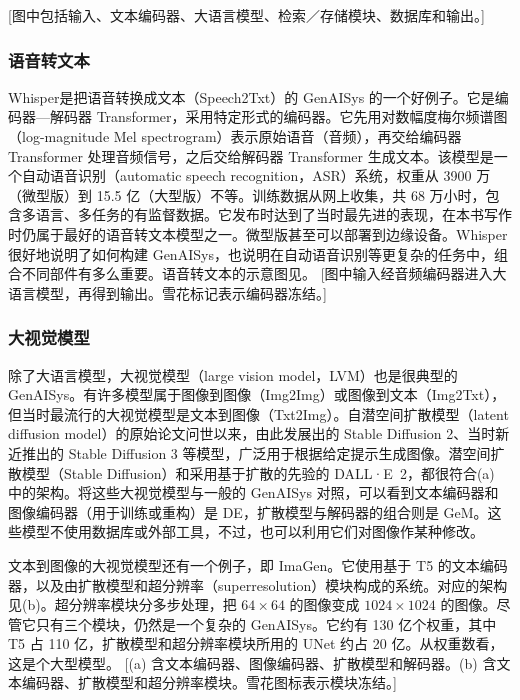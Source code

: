 [图中包括输入、文本编码器、大语言模型、检索／存储模块、数据库和输出。]

\subsubsection{语音转文本}
Whisper是把语音转换成文本（Speech2Txt）的 GenAISys 的一个好例子。它是编码器—解码器 Transformer，采用特定形式的编码器。它先用对数幅度梅尔频谱图（log-magnitude Mel spectrogram）表示原始语音（音频），再交给编码器 Transformer 处理音频信号，之后交给解码器 Transformer 生成文本。该模型是一个自动语音识别（automatic speech recognition，ASR）系统，权重从 3900 万（微型版）到 15.5 亿（大型版）不等。训练数据从网上收集，共 68 万小时，包含多语言、多任务的有监督数据。它发布时达到了当时最先进的表现，在本书写作时仍属于最好的语音转文本模型之一。微型版甚至可以部署到边缘设备。Whisper 很好地说明了如何构建 GenAISys，也说明在自动语音识别等更复杂的任务中，组合不同部件有多么重要。语音转文本的示意图见。
[图中输入经音频编码器进入大语言模型，再得到输出。雪花标记表示编码器冻结。]

\subsubsection{大视觉模型}
除了大语言模型，大视觉模型（large vision model，LVM）也是很典型的 GenAISys。有许多模型属于图像到图像（Img2Img）或图像到文本（Img2Txt），但当时最流行的大视觉模型是文本到图像（Txt2Img）。自潜空间扩散模型（latent diffusion model）的原始论文问世以来，由此发展出的 Stable Diffusion 2、当时新近推出的 Stable Diffusion 3 等模型，广泛用于根据给定提示生成图像。潜空间扩散模型（Stable Diffusion）和采用基于扩散的先验的 DALL·E~2，都很符合(a) 中的架构。将这些大视觉模型与一般的 GenAISys 对照，可以看到文本编码器和图像编码器（用于训练或重构）是 DE，扩散模型与解码器的组合则是 GeM。这些模型不使用数据库或外部工具，不过，也可以利用它们对图像作某种修改。

文本到图像的大视觉模型还有一个例子，即 ImaGen。它使用基于 T5 的文本编码器，以及由扩散模型和超分辨率（superresolution）模块构成的系统。对应的架构见(b)。超分辨率模块分多步处理，把 $64\times64$ 的图像变成 $1024\times1024$ 的图像。尽管它只有三个模块，仍然是一个复杂的 GenAISys。它约有 130 亿个权重，其中 T5 占 110 亿，扩散模型和超分辨率模块所用的 UNet 约占 20 亿。从权重数看，这是个大型模型。
[(a) 含文本编码器、图像编码器、扩散模型和解码器。(b) 含文本编码器、扩散模型和超分辨率模块。雪花图标表示模块冻结。]

